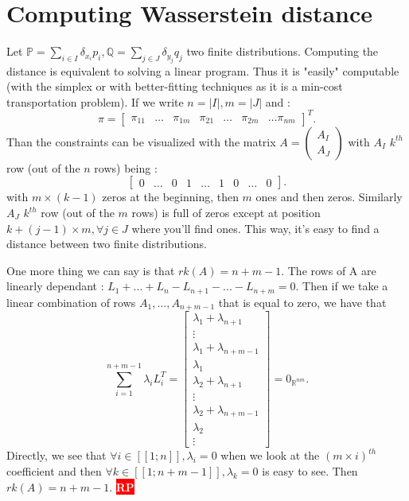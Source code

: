 \documentclass{amsart}
\newcommand{\nb}[3]{
		{\colorbox{#2}{\bfseries\sffamily\tiny\textcolor{white}{#1}}}
		{\textcolor{#2}{\text{$\blacktriangleright$}{\textcolor{#2}{#3}}\text{$\blacktriangleleft$}}}}
\newcommand{\rp}[1]{\nb{RP}{red}{#1}}
\newcommand{\RR}{\mathbb{R}}
\begin{document}
\section{Computing Wasserstein distance}
\label{compute}
Let $\mathbb{P}=\sum_{i\in I}\delta_{x_i}p_i, \mathbb{Q}=\sum_{j\in J}\delta_{y_j}q_j$ two finite distributions. Computing the distance is equivalent to solving a linear program. Thus it is "easily" computable (with the simplex or with better-fitting techniques as it is a min-cost transportation problem).
If we write $n=|I|, m=|J|$ and :
$$
\pi=\begin{bmatrix}
    \pi_{11}& \hdots&\pi_{1m}&\pi_{21}&\hdots&\pi_{2m}&\hdots\pi_{nm}
\end{bmatrix}^T.
$$
Than the constraints can be visualized with the matrix $A=\begin{pmatrix}
    A_I \\
    A_J
\end{pmatrix}$ with $A_I$ $k^{th}$ row (out of the $n$ rows) being : 
$$\begin{bmatrix}
    0&\hdots&0&1&\hdots&1&0&\hdots&0
\end{bmatrix}.$$
with $m\times(k-1)$ zeros at the beginning, then $m$ ones and then zeros. 
\newline
Similarly $A_J$ $k^{th}$ row (out of the $m$ rows) is full of zeros except at position $k+(j-1)\times m, \forall j\in J$ where you'll find ones. This way, it's easy to find a distance between two finite distributions.
\newline

One more thing we can say is that $rk(A)=n+m-1$. The rows of A are linearly dependant : $L_1+...+L_n-L_{n+1}-...-L_{n+m}=0$. Then if we take a linear combination of rows $A_1,...,A_{n+m-1}$ that is equal to zero, we have that $$
\sum_{i=1}^{n+m-1}\lambda_iL_i^T=\begin{bmatrix}
    \lambda_1+\lambda_{n+1}\\ \vdots\\ \lambda_1+\lambda_{n+m-1}\\ \lambda_{1} \\ \lambda_2+\lambda_{n+1} \\ \vdots \\ \lambda_2+\lambda_{n+m-1}\\ \lambda_2  \\ \vdots
\end{bmatrix}=0_{\RR^{nm}}.
$$
Directly, we see that $\forall i \in [\![1;n]\!], \lambda_i=0$ when we look at the $(m\times i)^{th}$ coefficient and then $\forall k\in[\![1;n+m-1]\!], \lambda_k=0$ is easy to see. Then $rk(A)=n+m-1$. \rp{kind of useless as we know that the number of variables in basis is $n+m$ (number of constraints) but can be the starting point of sparsity explanation if I study regularization as Benoît mentionned}
\end{document}
